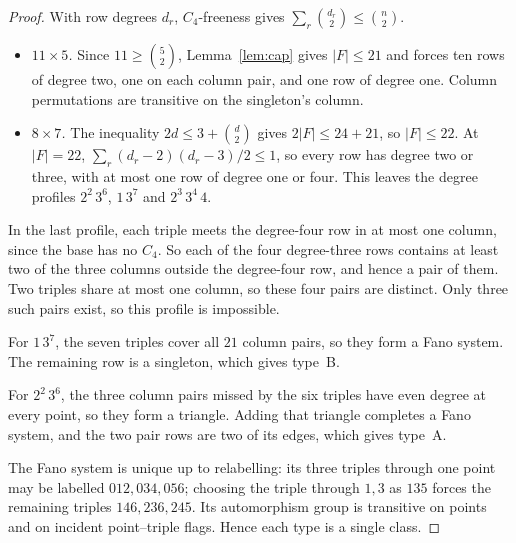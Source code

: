 \documentclass[11pt,a4paper]{article}
\theoremstyle{definition}
\begin{document}
\begin{proof}
With row degrees $d_r$, $C_4$-freeness gives
$\sum_r\binom{d_r}2\le\binom n2$.
\begin{itemize}
\item \emph{$11\times5$.} Since $11\ge\binom52$, Lemma~\ref{lem:cap} gives
  $|F|\le21$ and forces ten rows of degree two, one on each column pair,
  and one row of degree one. Column permutations are transitive on the
  singleton's column.
\item \emph{$8\times7$.} The inequality $2d\le3+\binom d2$ gives
  $2|F|\le24+21$, so $|F|\le22$. At $|F|=22$, $\sum_r(d_r-2)(d_r-3)/2\le1$,
  so every row has degree two or three, with at most one row of degree one
  or four. This leaves the degree profiles $2^2\,3^6$, $1\,3^7$ and
  $2^3\,3^4\,4$.
\end{itemize}
In the last profile, each triple meets the degree-four row in at most one
column, since the base has no $C_4$. So each of the four degree-three
rows contains at least two of the three columns outside the degree-four
row, and hence a pair of them. Two triples share at most one column, so
these four pairs are distinct. Only three such pairs exist, so this
profile is impossible.

For $1\,3^7$, the seven triples cover all $21$ column pairs, so they form
a Fano system. The remaining row is a singleton, which gives type~B.

For $2^2\,3^6$, the three column pairs missed by the six triples have even
degree at every point, so they form a triangle. Adding that triangle
completes a Fano system, and the two pair rows are two of its edges,
which gives type~A.

The Fano system is unique up to relabelling: its three triples through
one point may be labelled $012,034,056$; choosing the triple through
$1,3$ as $135$ forces the remaining triples $146,236,245$.
Its automorphism group is transitive on points and on incident
point--triple flags. Hence each type is a single class.
\end{proof}
\end{document}
